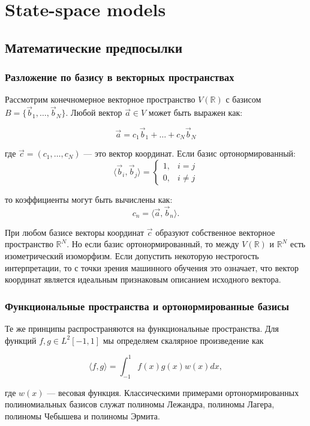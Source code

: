 \documentclass[11pt]{extarticle}
\begin{document}
\section{State-space models}

\subsection{Математические предпосылки}

\subsubsection{Разложение по базису в векторных пространствах}

Рассмотрим конечномерное векторное пространство $V(\mathbb{R})$ с базисом $B = \{\vec{b}_1, \ldots, \vec{b}_N\}$. Любой вектор $\vec{a} \in V$ может быть выражен как:

$$\vec{a} = c_1\vec{b}_1 + \ldots + c_N\vec{b}_N$$

где $\vec{c} = (c_1, \ldots, c_N)$ — это вектор координат. Если базис ортонормированный:
$$\langle \vec{b}_i, \vec{b}_j \rangle = \begin{cases} 1, & i = j \\ 0, & i \neq j \end{cases}$$

то коэффициенты могут быть вычислены как:
$$c_n = \langle \vec{a}, \vec{b}_n \rangle.$$

При любом базисе векторы координат $\vec c$ образуют собственное векторное пространство $\mathbb{R}^N$. Но если базис ортонормированный, то между $V(\mathbb{R})$ и $\mathbb{R}^N$ есть изометрический изоморфизм. Если допустить некоторую нестрогость интерпретации, то с точки зрения машинного обучения это означает, что вектор координат является идеальным признаковым описанием исходного вектора.

\subsubsection{Функциональные пространства и ортонормированные базисы}

Те же принципы распространяются на функциональные пространства. Для функций $f, g \in L^2[-1,1]$ мы определяем скалярное произведение как

$$\langle f, g \rangle = \int_{-1}^1 f(x)g(x) w(x) dx,$$

где $w(x)$ — весовая функция. Классическими примерами ортонормированных полиномиальных базисов служат полиномы Лежандра, полиномы Лагера, полиномы Чебышева и полиномы Эрмита.
\end{document}
